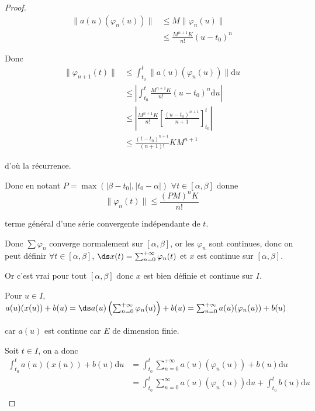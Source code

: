 \begin{proof}
    \begin{align}
        \| a(u)(\varphi_n(u)) \| & \leqslant M \| \varphi_n(u) \| \\
        & \leqslant \frac{M^{n + 1} K}{n!}(u - t_0)^n
    \end{align}

    Donc 
    \begin{align}
        \| \varphi_{n + 1}(t) \| & \leqslant \int_{t_0}^{t} \| a(u)(\varphi_n(u)) \| \mathrm d u \\
        & \leqslant \left| \int_{t_0}^{t} \frac{M^{n + 1}K}{n!} (u - t_0)^n \mathrm d u \right| \\
        & \leqslant \left| \frac{M^{n + 1} K }{n!} \left[ \frac{(u - t_0)^{n + 1}}{n + 1} \right]_{t_0}^{t} \right| \\
        & \leqslant \frac{(t - t_0)^{n + 1}}{(n + 1)!} K M^{n + 1}
    \end{align}

    d'où la récurrence. 

    Donc en notant $P = \max (|\beta - t_0|, |t_0 - \alpha|)$ 
    $\forall t \in [\alpha, \beta]$ donne 
    $$\| \varphi_n(t) \| \leqslant \frac{(PM)^n K }{n!}$$

    terme général d'une série convergente indépendante de $t$. 

    Donc $\sum \varphi_n$ converge normalement sur $[\alpha, \beta]$, or 
    les $\varphi_n$ sont continues, donc on peut définir 
    $\forall t \in [\alpha, \beta]$, $\ds x(t) = \sum_{n = 0}^{+ \infty} \varphi_n(t)$ et 
    $x$ est continue sur $[\alpha, \beta]$.

    Or c'est vrai pour tout $[\alpha, \beta]$ donc $x$ est bien définie et continue sur $I$. 

    Pour $u \in I$, $a(u)(x(u)) + b(u) = \ds a(u) \left( \sum_{n = 0}^{+ \infty} \varphi_n(u) \right) + b(u) = \sum_{n = 0}^{+ \infty} a(u)(\varphi_n(u)) + b(u)$

    car $a(u)$ est continue car $E$ de dimension finie. 

    Soit $t \in I$, on a donc 
    \begin{align}
        \int_{t_0}^{t} a(u)(x(u)) + b(u) \mathrm d u & = \int_{t_0}^{t} \sum_{n = 0}^{+ \infty} a(u)(\varphi_n(u)) + b(u) \mathrm d u \\
        & = \int_{t_0}^{t} \sum_{n = 0}^{\infty} a(u)(\varphi_n(u)) \mathrm d u + \int_{t_0}^{t} b(u) \mathrm d u \\
    \end{align}


\end{proof}
